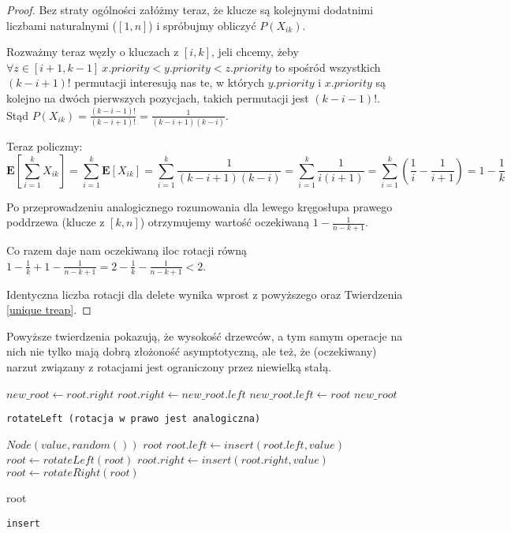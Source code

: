 \begin{proof}
Bez straty ogólności załóżmy teraz, że klucze są kolejnymi dodatnimi liczbami naturalnymi ($[1,n]$) i spróbujmy obliczyć $P(X_{ik})$.

Rozważmy teraz węzły o kluczach z $[i, k]$, jeli chcemy, żeby $\forall z\in[i+1,k-1]\ x.priority < y.priority < z.priority$ to spośród wszystkich $(k-i+1)!$ permutacji interesują nas te, w których $y.priority$ i $x.priority$ są kolejno na dwóch pierwszych pozycjach, takich permutacji jest  $(k-i-1)!$.
Stąd $P(X_{ik}) = \frac{(k -i - 1)!}{(k -i + 1)!} =  \frac{1}{(k-i+1)(k-i)}$.

Teraz policzmy:
$$
\mathbf{E}[\sum_{i=1}^{k}X_{ik}]=
\sum_{i=1}^{k}\mathbf{E}[X_{ik}]=
\sum_{i=1}^{k}\frac{1}{(k-i+1)(k-i)}=
\sum_{i=1}^{k}\frac{1}{i(i+1)}=
\sum_{i=1}^{k}(\frac{1}{i}-\frac{1}{i+1})=
1-\frac{1}{k}
$$

Po przeprowadzeniu analogicznego rozumowania dla lewego kręgosłupa prawego poddrzewa (klucze z $[k,n]$) otrzymujemy wartość oczekiwaną $1 - \frac{1}{n-k+1}$.

Co razem daje nam oczekiwaną iloc rotacji równą $1 - \frac{1}{k} + 1 - \frac{1}{n-k+1} = 2 -  \frac{1}{k} - \frac{1}{n-k+1} < 2$.

Identyczna liczba rotacji dla delete wynika wprost z powyższego oraz Twierdzenia \ref{unique treap}.
\end{proof}

Powyższe twierdzenia pokazują, że wysokość drzewców, a tym samym operacje na nich nie tylko mają dobrą złożoność asymptotyczną, ale też, że (oczekiwany) narzut związany z rotacjami jest ograniczony przez niewielką stałą.

\begin{algorithm}
  \DontPrintSemicolon


  $new\_root \leftarrow root.right$\;
  $root.right \leftarrow new\_root.left$\;
  $new\_root.left \leftarrow root$\;
  \Return $new\_root$\;
  
  \caption{\texttt{rotateLeft (rotacja w prawo jest analogiczna)}}
  \label{treap-rotate-left}
\end{algorithm}

\begin{algorithm}
  \DontPrintSemicolon

  {
    \Return $Node(value, random())$\;
  }
  {
    \Return $root$\;
  }
  {
    $root.left \leftarrow insert(root.left, value)$\;
    {
      $root \leftarrow rotateLeft(root)$\;
    }
  }
  {
    $root.right \leftarrow insert(root.right, value)$\;
    {
      $root \leftarrow rotateRight(root)$\;
    }
  }
  
  \Return root\;
  \caption{\texttt{insert}}
  \label{treap-insert}
\end{algorithm}

